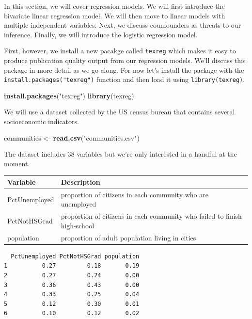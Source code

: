 \documentclass[]{article}
\newenvironment{Shaded}{\begin{snugshade}}{\end{snugshade}}
\newcommand{\KeywordTok}[1]{\textcolor[rgb]{0.13,0.29,0.53}{\textbf{#1}}}
\newcommand{\NormalTok}[1]{#1}
\newcommand{\StringTok}[1]{\textcolor[rgb]{0.31,0.60,0.02}{#1}}
\begin{document}
In this section, we will cover regression models. We will first introduce the bivariate linear regression model. We will then move to linear models with multiple independent variables. Next, we discuss counfounders as threats to our inference. Finally, we will introduce the logistic regression model.

First, however, we install a new pacakge called \texttt{texreg} which makes it easy to produce publication quality output from our regression models. We'll discuss this package in more detail as we go along. For now let's install the package with the \texttt{install.packages("texreg")} function and then load it using \texttt{library(texreg)}.

\begin{Shaded}
\begin{Highlighting}[]
\KeywordTok{install.packages}\NormalTok{(}\StringTok{"texreg"}\NormalTok{)}
\KeywordTok{library}\NormalTok{(texreg)}
\end{Highlighting}
\end{Shaded}

We will use a dataset collected by the US census bureau that contains several socioeconomic indicators.

\begin{Shaded}
\begin{Highlighting}[]
\NormalTok{communities <-}\StringTok{ }\KeywordTok{read.csv}\NormalTok{(}\StringTok{"communities.csv"}\NormalTok{)}
\end{Highlighting}
\end{Shaded}

The dataset includes 38 variables but we're only interested in a handful at the moment.

\begin{tabular}{l|l}
\hline
Variable & Description\\
\hline
PctUnemployed & proportion of citizens in each community who are unemployed\\
\hline
PctNotHSGrad & proportion of citizens in each community who failed to finish high-school\\
\hline
population & proportion of adult population living in cities\\
\hline
\end{tabular}

\begin{verbatim}
  PctUnemployed PctNotHSGrad population
1          0.27         0.18       0.19
2          0.27         0.24       0.00
3          0.36         0.43       0.00
4          0.33         0.25       0.04
5          0.12         0.30       0.01
6          0.10         0.12       0.02
\end{verbatim}
\end{document}
